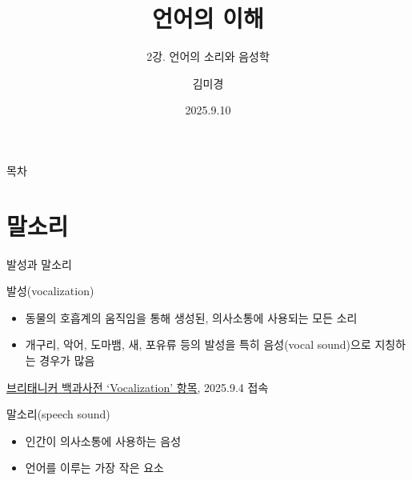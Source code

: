 \documentclass[11pt, aspectratio=169]{beamer}
\title{언어의 이해}
\subtitle{2강. 언어의 소리와 음성학}
\author{김미경}
\date{2025.9.10}
\begin{document}
\frame{\titlepage}

\begin{frame}[t]{목차}
\tableofcontents
\end{frame}

\section{말소리}

\begin{frame}[t]{발성과 말소리}
  \begin{block}{발성(vocalization)}
    \begin{itemize}
        \item 동물의 호흡계의 움직임을 통해 생성된, 의사소통에 사용되는 모든 소리
        \item 개구리, 악어, 도마뱀, 새, 포유류 등의 발성을 특히 음성(vocal sound)으로 지칭하는 경우가 많음
    \end{itemize}
  \end{block}
  \begin{flushright}
    \href{https://www.britannica.com/science/vocalization}{\underline{브리태니커 백과사전 ‘Vocalization’ 항목}}, 2025.9.4 접속
  \end{flushright}
  \begin{block}{말소리(speech sound)}
    \begin{itemize}
        \item 인간이 의사소통에 사용하는 음성
        \item 언어를 이루는 가장 작은 요소
    \end{itemize}
  \end{block}
\end{frame}
\end{document}
